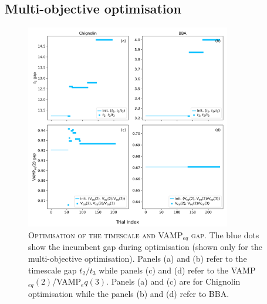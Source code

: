 \documentclass{article}
\begin{document}
\FloatBarrier
\clearpage


\subsection{Multi-objective optimisation}

\begin{figure}
    \centering
    \includegraphics[width=0.8\textwidth]{SI_figures/optimisation_gap_summary.pdf}
    \caption{\textsc{Optimisation of the timescale and VAMP$_{eq}$ gap.} The blue dots show the incumbent gap during optimisation (shown only for the multi-objective optimisation). Panels (a) and (b) refer to the timescale gap $t_2/t_3$ while panels (c) and (d) refer to the VAMP$_{eq}(2)$/VAMP$_eq(3)$. Panels (a) and (c) are for Chignolin optimisation while the panels (b) and (d) refer to BBA.}
    \label{fig:gap_optimiation}
\end{figure}



\end{document}
